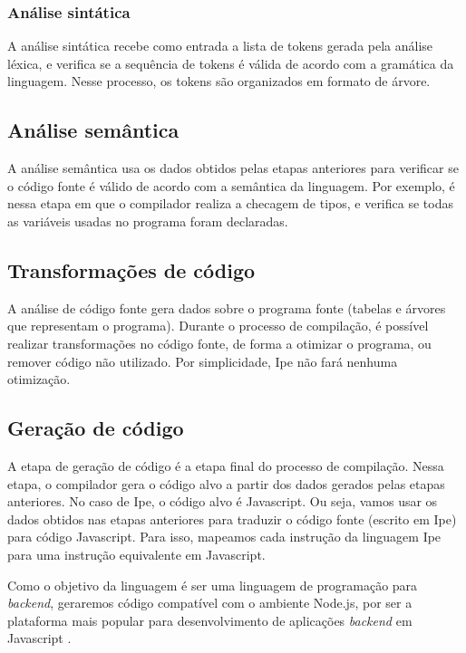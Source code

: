 \subsubsection{Análise sintática}

A análise sintática recebe como entrada a lista de tokens gerada pela análise
léxica, e verifica se a sequência de tokens é válida de acordo com a gramática da
linguagem. Nesse processo, os tokens são organizados em formato de árvore.

\subsection{Análise semântica}\label{sec:semantic}

A análise semântica usa os dados obtidos pelas etapas anteriores para verificar se
o código fonte é válido de acordo com a semântica da linguagem. Por exemplo, é
nessa etapa em que o compilador realiza a checagem de tipos, e verifica se todas
as variáveis usadas no programa foram declaradas.


\subsection{Transformações de código}\label{sec:transformations}

A análise de código fonte gera dados sobre o programa fonte (tabelas e árvores que
representam o programa). Durante o processo de compilação, é possível realizar
transformações no código fonte, de forma a otimizar o programa, ou remover código
não utilizado. Por simplicidade, Ipe não fará nenhuma otimização.


\subsection{Geração de código}\label{sec:code_generation}

A etapa de geração de código é a etapa final do processo de compilação. Nessa
etapa, o compilador gera o código alvo a partir dos dados gerados pelas etapas
anteriores. No caso de Ipe, o código alvo é Javascript. Ou seja, vamos usar os dados
obtidos nas etapas anteriores para traduzir o código fonte (escrito em Ipe) para
código Javascript. Para isso, mapeamos cada instrução da linguagem Ipe para uma
instrução equivalente em Javascript.

Como o objetivo da linguagem é ser uma linguagem de programação para \textit{backend},
geraremos código compatível com o ambiente Node.js, por ser a plataforma mais popular
para desenvolvimento de aplicações \textit{backend} em Javascript \cite{stackoverflowsurvey}.
